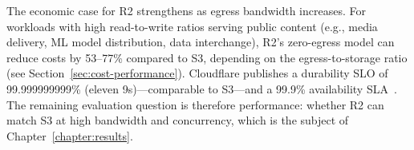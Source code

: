 The economic case for R2 strengthens as egress bandwidth increases. For workloads with high read-to-write ratios serving public content (e.g., media delivery, ML model distribution, data interchange), R2's zero-egress model can reduce costs by 53--77\% compared to S3, depending on the egress-to-storage ratio (see Section~\ref{sec:cost-performance}). Cloudflare publishes a durability SLO of 99.999999999\% (eleven 9s)---comparable to S3---and a 99.9\% availability SLA~\cite{cloudflare-r2-durability}. The remaining evaluation question is therefore performance: whether R2 can match S3 at high bandwidth and concurrency, which is the subject of Chapter~\ref{chapter:results}.
